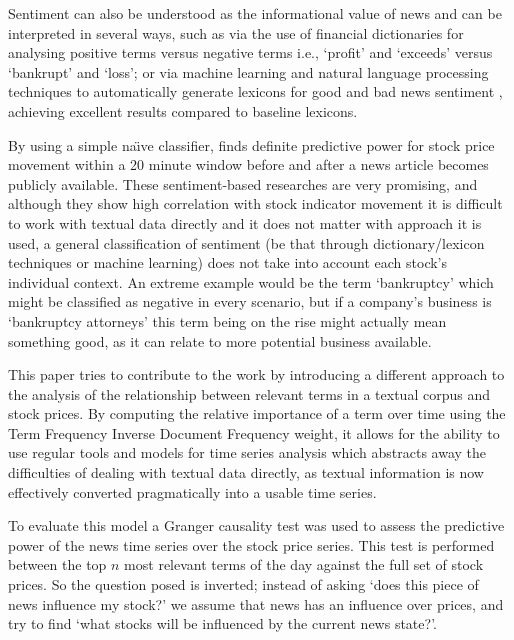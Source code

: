\documentclass[conference,11pt]{IEEEtran}
\begin{document}
\par
Sentiment can also be understood as the informational value of news and can be interpreted in several ways, such as via the use of financial dictionaries for analysing positive terms versus negative terms 
i.e., `profit' and `exceeds' versus `bankrupt' and `loss'; or via machine learning and natural language processing techniques to automatically generate lexicons for good and bad news sentiment \citep{Oliveira2014}, achieving excellent results compared to baseline lexicons.

\par
By using a simple na\"{\i}ve classifier, \citep{gidofalvi2001} finds definite predictive power for stock price movement within a 20 minute window before and after a news article becomes publicly available. These sentiment-based researches are very promising, and although they show high correlation with stock indicator movement it is difficult to work with textual data directly and it does not matter with approach it is used, a general classification of sentiment (be that through dictionary/lexicon techniques or machine learning) does not take into account each stock's individual context. An extreme example would be the term `bankruptcy' which might be classified as negative in every scenario, but if a company's business is `bankruptcy attorneys' this term being on the rise might actually mean something good, as it can relate to more potential business available.

\par
This paper tries to contribute to the work by introducing a different approach to the analysis of the relationship between relevant terms in a textual corpus and stock prices. By computing the relative importance of a term over time using the Term Frequency Inverse Document Frequency \citep{Ramos2003} weight, it allows for the ability to use regular tools and models for time series analysis which abstracts away the difficulties of dealing with textual data directly, as textual information is now effectively converted pragmatically into a usable time series.

\par
To evaluate this model a Granger causality test \citep{Granger1969,Granger1980} was used to assess the predictive power of the news time series over the stock price series. This test is performed between the top \(n\) most relevant terms of the day against the full set of stock prices. So the question posed is inverted; instead of asking `does this piece of news influence my stock?' we assume that news has an influence over prices, and try to find `what stocks will be influenced by the current news state?'.
\end{document}

